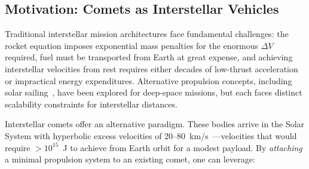 \documentclass{article}
\begin{document}
\subsection{Motivation: Comets as Interstellar Vehicles}

Traditional interstellar mission architectures face fundamental challenges: the rocket equation imposes exponential mass penalties for the enormous $\Delta V$ required, fuel must be transported from Earth at great expense, and achieving interstellar velocities from rest requires either decades of low-thrust acceleration or impractical energy expenditures. Alternative propulsion concepts, including solar sailing~\cite{macdonald2011solar}, have been explored for deep-space missions, but each faces distinct scalability constraints for interstellar distances.

Interstellar comets offer an alternative paradigm. These bodies arrive in the Solar System with hyperbolic excess velocities of 20--80~km/s~\cite{jewitt2022interstellar}---velocities that would require $>10^{15}$~J to achieve from Earth orbit for a modest payload. By \textit{attaching} a minimal propulsion system to an existing comet, one can leverage:
\end{document}
